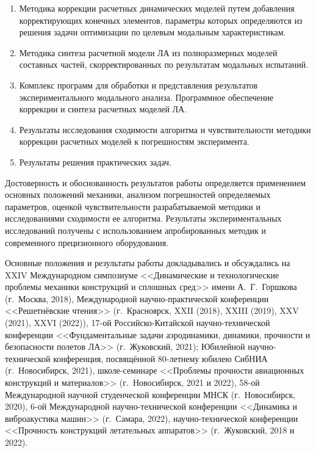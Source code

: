 {}
\begin{enumerate}[beginpenalty = 10000] 
	\item Методика коррекции расчетных динамических моделей путем добавления корректирующих конечных элементов, параметры которых определяются из решения задачи оптимизации по целевым модальным характеристикам.
	\item Методика синтеза расчетной модели ЛА из полноразмерных моделей составных частей, скорректированных по результатам модальных испытаний.
	\item Комплекс программ для обработки и представления результатов экспериментального модального анализа. Программное обеспечение коррекции и синтеза расчетных моделей ЛА.
	\item Результаты исследования сходимости алгоритма и чувствительности методики коррекции расчетных моделей к погрешностям эксперимента.
	\item Результаты решения практических задач.
\end{enumerate}

{\reliability} 

Достоверность и обоснованность результатов работы определяется применением основных положений механики, анализом погрешностей определяемых параметров, оценкой чувствительности разрабатываемой методики и исследованиями сходимости ее алгоритма. Результаты экспериментальных исследований получены с использованием апробированных методик и современного прецизионного оборудования.

Основные положения и результаты работы докладывались и обсуждались на XXIV Международном симпозиуме <<Динамические и технологические проблемы механики конструкций и сплошных сред>> имени А.~Г.~Горшкова (г.~Москва, 2018), Международной научно-практической конференции <<Решетнёвские чтения>> (г.~Красноярск, XXII (2018), XXIII (2019), XXV (2021), XXVI (2022)), 17-ой Российско-Китайской научно-технической конференции <<Фундаментальные задачи аэродинамики, динамики, прочности и безопасности полетов ЛА>> (г.~Жуковский, 2021); Юбилейной научно-технической конференция, посвящённой 80-летнему юбилею СибНИА (г.~Новосибирск, 2021), школе-семинаре <<Проблемы прочности авиационных конструкций и материалов>> (г.~Новосибирск, 2021 и 2022), 58-ой Международной научной студенческой конференции МНСК (г.~Новосибирск, 2020), 6-ой Международной научно-технической конференции <<Динамика и виброакустика машин>> (г.~Самара, 2022), научно-технической конференции <<Прочность конструкций летательных аппаратов>> (г.~Жуковский, 2018 и 2022). 

